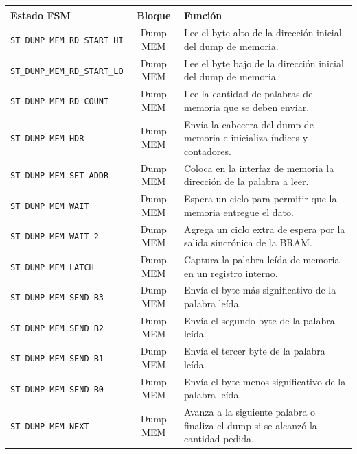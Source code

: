 \begin{center}
\begin{tabular}{|l|c|p{8.3cm}|}
\hline
\textbf{Estado FSM} & \textbf{Bloque} & \textbf{Función} \\ \hline
\texttt{ST\_DUMP\_MEM\_RD\_START\_HI} & Dump MEM & Lee el byte alto de la dirección inicial del dump de memoria. \\ \hline
\texttt{ST\_DUMP\_MEM\_RD\_START\_LO} & Dump MEM & Lee el byte bajo de la dirección inicial del dump de memoria. \\ \hline
\texttt{ST\_DUMP\_MEM\_RD\_COUNT} & Dump MEM & Lee la cantidad de palabras de memoria que se deben enviar. \\ \hline
\texttt{ST\_DUMP\_MEM\_HDR} & Dump MEM & Envía la cabecera del dump de memoria e inicializa índices y contadores. \\ \hline
\texttt{ST\_DUMP\_MEM\_SET\_ADDR} & Dump MEM & Coloca en la interfaz de memoria la dirección de la palabra a leer. \\ \hline
\texttt{ST\_DUMP\_MEM\_WAIT} & Dump MEM & Espera un ciclo para permitir que la memoria entregue el dato. \\ \hline
\texttt{ST\_DUMP\_MEM\_WAIT\_2} & Dump MEM & Agrega un ciclo extra de espera por la salida sincrónica de la BRAM. \\ \hline
\texttt{ST\_DUMP\_MEM\_LATCH} & Dump MEM & Captura la palabra leída de memoria en un registro interno. \\ \hline
\texttt{ST\_DUMP\_MEM\_SEND\_B3} & Dump MEM & Envía el byte más significativo de la palabra leída. \\ \hline
\texttt{ST\_DUMP\_MEM\_SEND\_B2} & Dump MEM & Envía el segundo byte de la palabra leída. \\ \hline
\texttt{ST\_DUMP\_MEM\_SEND\_B1} & Dump MEM & Envía el tercer byte de la palabra leída. \\ \hline
\texttt{ST\_DUMP\_MEM\_SEND\_B0} & Dump MEM & Envía el byte menos significativo de la palabra leída. \\ \hline
\texttt{ST\_DUMP\_MEM\_NEXT} & Dump MEM & Avanza a la siguiente palabra o finaliza el dump si se alcanzó la cantidad pedida. \\ \hline
\end{tabular}
\end{center}

\vspace{0.8em}

